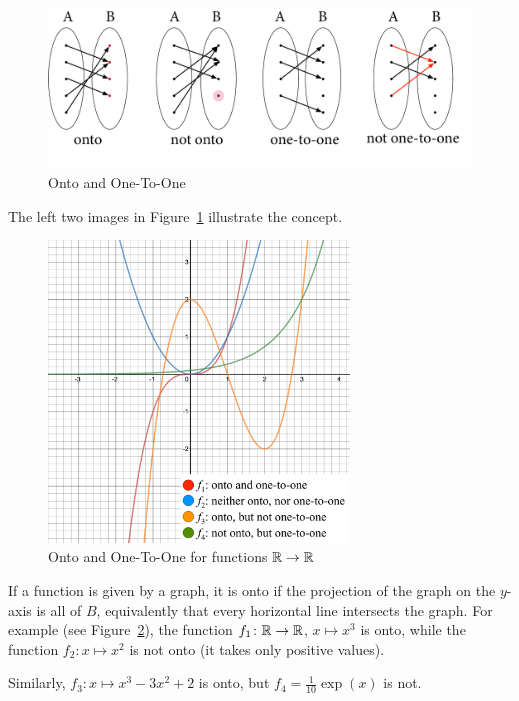 \begin{figure}[t]
\begin{center}
\includegraphics[width=\the\textwidth]{pic/OntoPics.pdf}
\caption{Onto and One-To-One}
\label{figoneonto}
\end{center}
\end{figure}

The left two images in Figure~\ref{figoneonto} illustrate the concept.

\begin{figure}[t]
\begin{center}
\includegraphics[width=8cm]{pic/OneToOneOnto.pdf}
\caption{Onto and One-To-One for functions ${\mathbb R}\to{\mathbb R}$}
\label{figoneontofcts}
\end{center}
\end{figure}

If a function is given by a graph, it is onto if the projection of the graph
on the $y$-axis is all of $B$, equivalently that every horizontal line intersects the
graph.
For example (see Figure~\ref{figoneontofcts}), the function $f_1\colon{\mathbb R}\to{\mathbb R}$, $x\mapsto x^3$ is onto, while
the function $f_2\colon x\mapsto x^2$ is not onto (it takes only positive
values).

Similarly, $f_3\colon x\mapsto x^3-3x^2+2$ is
onto, but $f_4=\frac{1}{10}\exp(x)$ is not.

